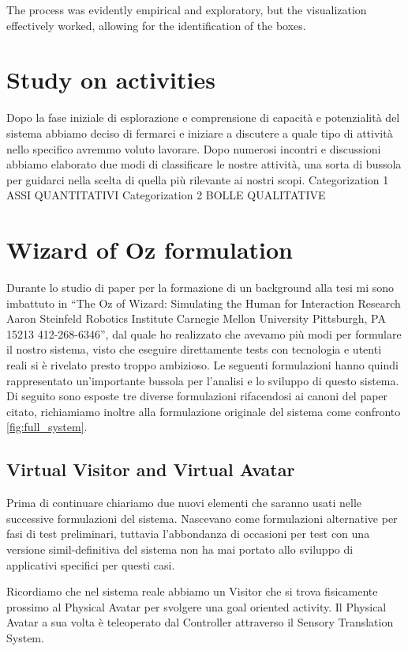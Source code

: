 \documentclass{Configuration_Files/PoliMi3i_thesis}
\begin{document}
The process was evidently empirical and exploratory, but the visualization effectively worked, allowing for the identification of the boxes.

\section{Study on activities}
Dopo la fase iniziale di esplorazione e comprensione di capacità e potenzialità del sistema abbiamo deciso di fermarci e iniziare a discutere a quale tipo di attività nello specifico avremmo voluto lavorare. Dopo numerosi incontri e discussioni abbiamo elaborato due modi di classificare le nostre attività, una sorta di bussola per guidarci nella scelta di quella più rilevante ai nostri scopi.
Categorization 1
ASSI QUANTITATIVI
Categorization 2
BOLLE QUALITATIVE

\section{Wizard of Oz formulation}
Durante lo studio di paper per la formazione di un background alla tesi mi sono imbattuto in “The Oz of Wizard: Simulating the Human for Interaction Research
Aaron Steinfeld
Robotics Institute
Carnegie Mellon University Pittsburgh, PA 15213 412-268-6346”, dal quale ho realizzato che avevamo più modi per formulare il nostro sistema, visto che eseguire direttamente tests con tecnologia e utenti reali si è rivelato presto troppo ambizioso. Le seguenti formulazioni hanno quindi rappresentato un’importante bussola per l'analisi e lo sviluppo di questo sistema. Di seguito sono esposte tre diverse formulazioni rifacendosi ai canoni del paper citato, richiamiamo inoltre alla formulazione originale del sistema come confronto \cref{fig:full_system}.


\subsection{Virtual Visitor and Virtual Avatar}

Prima di continuare chiariamo due nuovi elementi che saranno usati nelle successive formulazioni del sistema.
Nascevano come formulazioni alternative per fasi di test preliminari, tuttavia l'abbondanza di occasioni per test con una versione simil-definitiva del sistema non ha mai portato allo sviluppo di applicativi specifici per questi casi.

Ricordiamo che nel sistema reale abbiamo un Visitor che si trova fisicamente prossimo al Physical Avatar per svolgere una goal oriented activity. Il Physical Avatar a sua volta è teleoperato dal Controller attraverso il Sensory Translation System.
\end{document}

